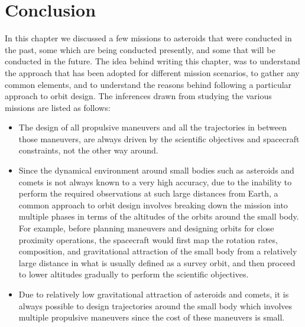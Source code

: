 \section{Conclusion}
\label{heritage_conclusion}
In this chapter we discussed a few missions to asteroids that were conducted in the past, some which are being conducted presently, and some that will be conducted in the future. The idea behind writing this chapter, was to understand the approach that has been adopted for different mission scenarios, to gather any common elements, and to understand the reasons behind following a particular approach to orbit design. The inferences drawn from studying the various missions are listed as follows:
\begin{itemize}
\item The design of all propulsive maneuvers and all the trajectories in between those maneuvers, are always driven by the scientific objectives and spacecraft constraints, not the other way around.
\item Since the dynamical environment around small bodies such as asteroids and comets is not always known to a very high accuracy, due to the inability to perform the required observations at such large distances from Earth, a common approach to orbit design involves breaking down the mission into multiple phases in terms of the altitudes of the orbits around the small body. For example, before planning maneuvers and designing orbits for close proximity operations, the spacecraft would first map the rotation rates, composition, and gravitational attraction of the small body from a relatively large distance in what is usually defined as a survey orbit, and then proceed to lower altitudes gradually to perform the scientific objectives.
\item Due to relatively low gravitational attraction of asteroids and comets, it is always possible to design trajectories around the small body which involves multiple propulsive maneuvers since the cost of these maneuvers is small.
\end{itemize}
